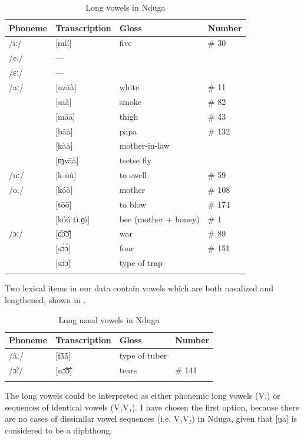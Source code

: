 \documentclass[output=paper,colorlinks,citecolor=brown
]{langscibook}
\begin{document}
\begin{table}
\caption{Long vowels in Nduga}
\label{tab:olson:longvowels}
 \begin{tabular}{llll}
  \lsptoprule
 Phoneme & Transcription & Gloss & Number \\
  \midrule
 /iː/ & [mìí] & five & \# 30 \\
 /eː/ & — & & \\
 /ɛː/ & — & & \\
 /aː/ & [nzāà] & white & \# 11 \\
      & [sāà] & smoke & \# 82 \\
      & [māā] & thigh & \# 43 \\
      & [bāà] & papa & \# 132 \\
      & [kàà] & mother-in-law & \\
      & [ɱvāà] & tsetse fly & \\
 /uː/ & [k-ūù] & to swell & \# 59 \\
 /oː/ & [kóò] & mother & \# 108 \\
      & [tōō] & to blow & \# 174 \\
      & [kóó tì.ɡì] & bee (mother + honey) & \# 1 \\
 /ɔː/ & [ɗɔ̄ɔ̄] & war & \# 89 \\
      & [sɔ̀ɔ́] & four & \# 151 \\
      & [sɔ̄ɔ̄] & type of trap & \\
  \lspbottomrule
 \end{tabular}
\end{table}

\newpage
Two lexical items in our data contain vowels which are both nasalized and lengthened, shown in .

\begin{table}
\caption{Long nasal vowels in Nduga}
\label{tab:olson:longnasalvowels}
 \begin{tabular}{llll}
  \lsptoprule
  Phoneme & Transcription & Gloss & Number \\
  \midrule
 /ãː/ & [fã́ã̄] & type of tuber & \\
 /ɔ̃ː/ & [nɔ̃̄ɔ̃̄] & tears & \# 141 \\
  \lspbottomrule
 \end{tabular}
\end{table}

The long vowels could be interpreted as either phonemic long vowels (Vː) or sequences of identical vowels (V₁V₁). I have chosen the first option, because there are no cases of dissimilar vowel sequences (i.e. V₁V₂) in Nduga, given that [u̯a] is considered to be a diphthong.
\end{document}
